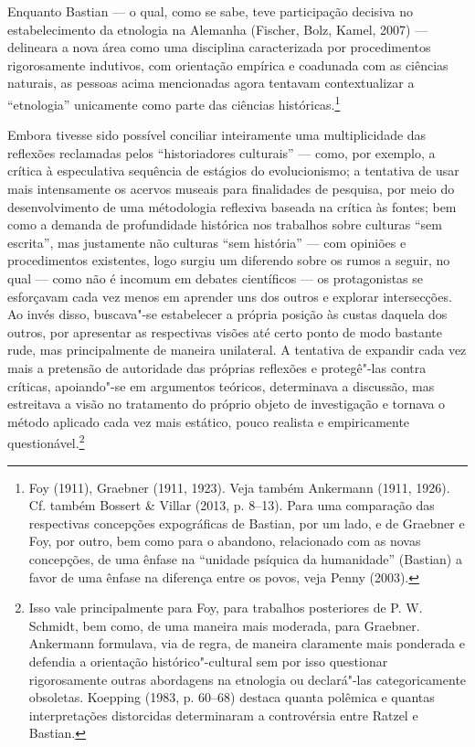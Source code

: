 Enquanto Bastian --- o qual, como se sabe, teve participação decisiva no
estabelecimento da etnologia na Alemanha (Fischer, Bolz, Kamel, 2007) ---
delineara a nova área como uma disciplina caracterizada por
procedimentos rigorosamente indutivos, com orientação empírica e
coadunada com as ciências naturais, as pessoas acima mencionadas agora
tentavam contextualizar a ``etnologia'' unicamente como parte das
ciências históricas.\footnote{Foy (1911), Graebner (1911, 1923). Veja
  também Ankermann (1911, 1926). Cf. também Bossert \& Villar (2013, p.
  8--13). Para uma comparação das respectivas concepções expográficas de
  Bastian, por um lado, e de Graebner e Foy, por outro, bem como para o
  abandono, relacionado com as novas concepções, de uma ênfase na
  ``unidade psíquica da humanidade'' (Bastian) a favor de uma ênfase na
  diferença entre os povos, veja Penny (2003).}

Embora tivesse sido possível conciliar inteiramente uma multiplicidade
das reflexões reclamadas pelos ``historiadores culturais'' --- como, por
exemplo, a crítica à especulativa sequência de estágios do
evolucionismo; a tentativa de usar mais intensamente os acervos museais
para finalidades de pesquisa, por meio do desenvolvimento de uma
métodologia reflexiva baseada na crítica às fontes; bem como a demanda
de profundidade histórica nos trabalhos sobre culturas ``sem escrita'',
mas justamente não culturas ``sem história'' --- com opiniões e
procedimentos existentes, logo surgiu um diferendo sobre os rumos a
seguir, no qual --- como não é incomum em debates científicos --- os
protagonistas se esforçavam cada vez menos em aprender uns dos outros e
explorar intersecções. Ao invés disso, buscava"-se estabelecer a própria
posição às custas daquela dos outros, por apresentar as respectivas
visões até certo ponto de modo bastante rude, mas principalmente de
maneira unilateral. A tentativa de expandir cada vez mais a pretensão
de autoridade das próprias reflexões e protegê"-las contra críticas,
apoiando"-se em argumentos teóricos, determinava a discussão, mas
estreitava a visão no tratamento do próprio objeto de investigação e
tornava o método aplicado cada vez mais estático, pouco realista e
empiricamente questionável.\footnote{Isso vale principalmente para Foy,
  para trabalhos posteriores de P. W. Schmidt, bem como, de uma maneira
  mais moderada, para Graebner. Ankermann formulava, via de regra, de
  maneira claramente mais ponderada e defendia a orientação
  histórico"-cultural sem por isso questionar rigorosamente outras
  abordagens na etnologia ou declará"-las categoricamente obsoletas.
  Koepping (1983, p. 60--68) destaca quanta polêmica e quantas
  interpretações distorcidas determinaram a controvérsia entre Ratzel e
  Bastian.}

